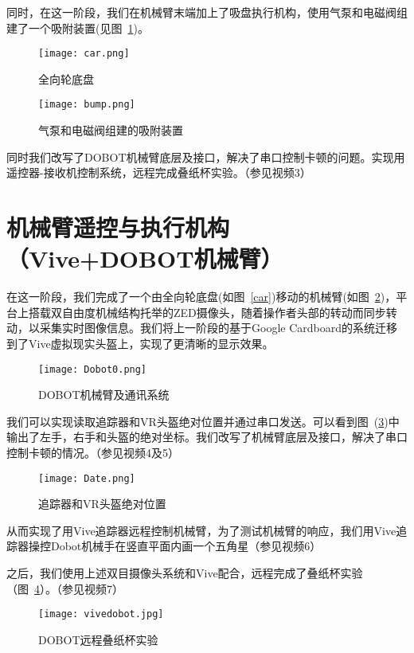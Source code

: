 同时，在这一阶段，我们在机械臂末端加上了吸盘执行机构，使用气泵和电磁阀组建了一个吸附装置(见图~\ref{bump})。

\begin{figure}
\begin{minipage}{0.48\textwidth}
  \centering
  \texttt{[image: car.png]}
  \caption{全向轮底盘}
  \label{car}
\end{minipage}\hfill
\begin{minipage}{0.48\textwidth}
  \centering
  \texttt{[image: bump.png]}
  \caption{气泵和电磁阀组建的吸附装置}
  \label{bump}
\end{minipage}
\end{figure}


同时我们改写了DOBOT机械臂底层及接口，解决了串口控制卡顿的问题。实现用遥控器-接收机控制系统，远程完成叠纸杯实验。{\kaishu （参见视频3）}

\section{机械臂遥控与执行机构（Vive+DOBOT机械臂）}

在这一阶段，我们完成了一个由全向轮底盘(如图~\ref{car})移动的机械臂(如图~\ref{sys})，平台上搭载双自由度机械结构托举的ZED摄像头，随着操作者头部的转动而同步转动，以采集实时图像信息。我们将上一阶段的基于Google Cardboard的系统迁移到了Vive虚拟现实头盔上，实现了更清晰的显示效果。


\begin{figure}[htbp]
\small
\centering
\texttt{[image: Dobot0.png]}
\caption{DOBOT机械臂及通讯系统} 
\label{sys}
\end{figure}


我们可以实现读取追踪器和VR头盔绝对位置并通过串口发送。可以看到图~(\ref{POS})中输出了左手，右手和头盔的绝对坐标。我们改写了机械臂底层及接口，解决了串口控制卡顿的情况。{\kaishu （参见视频4及5）}
\begin{figure}[htbp]
\small
\centering
\texttt{[image: Date.png]}
\caption{追踪器和VR头盔绝对位置} 
\label{POS}
\end{figure}

从而实现了用Vive追踪器远程控制机械臂，为了测试机械臂的响应，我们用Vive追踪器操控Dobot机械手在竖直平面内画一个五角星{\kaishu （参见视频6）}

之后，我们使用上述双目摄像头系统和Vive配合，远程完成了叠纸杯实验（图~\ref{cup}）。{\kaishu （参见视频7）}

\begin{figure}[htbp]
\small
\centering
\texttt{[image: vivedobot.jpg]}
\caption{DOBOT远程叠纸杯实验} 
\label{cup}
\end{figure}


